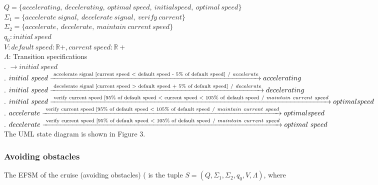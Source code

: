 \documentclass[12pt]{article}
\begin{document}
\begin{spacing}{1.5}
\noindent $Q = \{accelerating,~decelerating,~optimal~speed,~initial speed,~optimal~speed\}$\\
\noindent $\Sigma_1 = \{accelerate~signal,~decelerate~signal,~ verify~current\}$\\
\noindent $\Sigma_2 = \{accelerate,~decelerate,~maintain~current~speed\}$\\
\noindent $q_0: initial~speed$\\
\noindent $V: default~speed: \mathbb R+, current~speed: \mathbb R+$\\
\noindent $\Lambda$: Transition specifications\\
. $\rightarrow initial~speed$\\
. $initial~speed \xrightarrow {\text { accelerate signal [current speed \textless~default speed - 5\% of default speed]}~/ ~accelerate} accelerating$\\
. $initial~speed \xrightarrow {\text { decelerate signal [current speed \textgreater~default speed + 5\% of default speed]}~/ ~decelerate} decelerating$\\
. $initial~speed \xrightarrow {\text { verify current speed [95\% of default speed \textless~current speed \textless~105\% of default speed}~/~maintain~current~speed} optimal speed$\\
. $accelerate \xrightarrow {\text { verify current speed [95\% of default speed \textless~105\% of default speed}~/~maintain~current~speed} optimal speed$\\
. $decelerate \xrightarrow {\text { verify current speed [95\% of default speed \textless~105\% of default speed}~/~maintain~current~speed} optimal~speed$\\


\noindent The UML state diagram is shown in Figure 3.

\newpage

\subsubsection{Avoiding obstacles}

\noindent The EFSM of the cruise (avoiding obstacles) ( is the tuple $S = (Q, \Sigma_1, \Sigma_2, q_0, V, \Lambda)$, where\\


\end{spacing}
\end{document}
